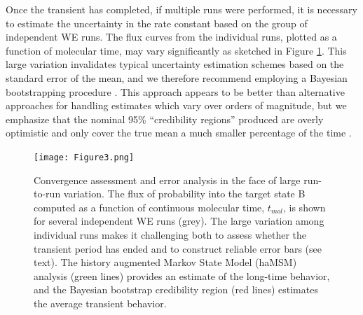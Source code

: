 Once the transient has completed, if multiple runs were performed, it is necessary to estimate the uncertainty in the rate constant based on the group of independent WE runs. 
The flux curves from the individual runs, plotted as a function of molecular time, may vary significantly as sketched in Figure \ref{fig:converge}. 
This large variation invalidates typical uncertainty estimation schemes based on the standard error of the mean, and we therefore recommend employing a Bayesian bootstrapping procedure \citep{MostofianJCTC2019}. 
This approach appears to be better than alternative approaches for handling estimates which vary over orders of magnitude, but we emphasize that the nominal 95\% “credibility regions” produced are overly optimistic and only cover the true mean a much smaller percentage of the time \citep{MostofianJCTC2019}.

\begin{figure}
\texttt{[image: Figure3.png]}
\caption{Convergence assessment and error analysis in the face of large run-to-run variation. 
The flux of probability into the target state B computed as a function of continuous molecular time, $t_{mol}$, is shown for several independent WE runs (grey). 
The large variation among individual runs makes it challenging both to assess whether the transient period has ended and to construct reliable error bars (see text). 
The history augmented Markov State Model (haMSM) analysis (green lines) provides an estimate of the long-time behavior, and the Bayesian bootstrap credibility region (red lines) estimates the average transient behavior.}
\label{fig:converge}
\end{figure}


